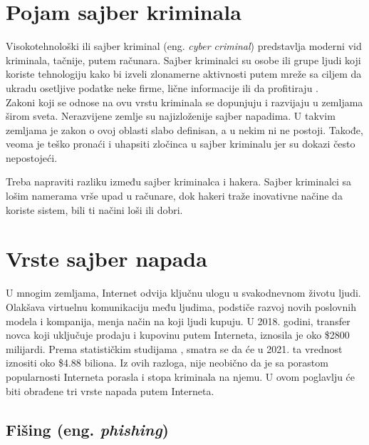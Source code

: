 \documentclass[a4paper]{article}
\theoremstyle{break}
\begin{document}
{\section{Pojam sajber kriminala}
\label{pojam}

Visokotehnološki ili sajber kriminal (eng. {\em cyber criminal}) predstavlja moderni vid kriminala, tačnije, putem računara. Sajber kriminalci su osobe ili grupe ljudi koji koriste tehnologiju kako bi izveli zlonamerne aktivnosti putem mreže sa ciljem da ukradu osetljive podatke neke firme, lične informacije ili da profitiraju \cite{sajber}.
\\Zakoni koji se odnose na ovu vrstu kriminala se dopunjuju i razvijaju u zemljama širom sveta. Nerazvijene zemlje su najizloženije sajber napadima. U takvim zemljama je zakon o ovoj oblasti slabo definisan, a u nekim ni ne postoji. Takođe, veoma je teško pronaći i uhapsiti zločinca u sajber kriminalu jer su dokazi često nepostojeći.

Treba napraviti razliku između sajber kriminalca i hakera. Sajber kriminalci sa lošim namerama vrše upad u računare, dok hakeri traže inovativne načine da koriste sistem, bili ti načini loši ili dobri.
\\

 

\section{Vrste sajber napada}

\label{sec:vrste_sajber_napada}

U mnogim zemljama, Internet odvija ključnu ulogu u svakodnevnom životu ljudi. Olakšava virtuelnu komunikaciju među ljudima, podstiče razvoj novih poslovnih modela i kompanija, menja način na koji ljudi kupuju. U 2018. godini, transfer novca koji uključuje prodaju i kupovinu putem Interneta, iznosila je oko \$2800 milijardi. Prema statističkim studijama \cite{statistika}, smatra se da će u 2021. ta vrednost iznositi oko \$4.88 biliona. Iz ovih razloga, nije neobično da je sa porastom popularnosti Interneta porasla i stopa kriminala na njemu. U ovom poglavlju će biti obrađene tri vrste napada putem Interneta.

\subsection{Fišing (eng. {\em phishing})}
\label{subsec:phishing}

}
\end{document}
